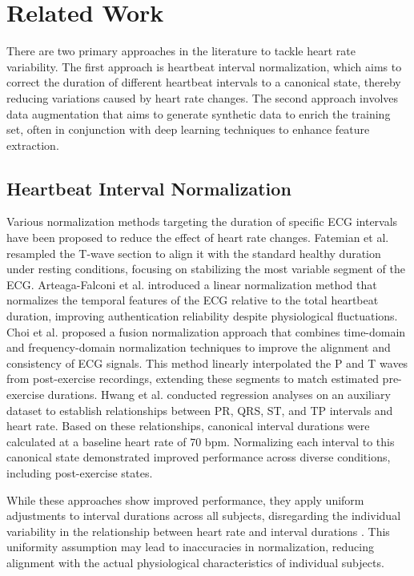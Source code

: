 \section{Related Work}

There are two primary approaches in the literature to tackle heart rate variability. The first approach is heartbeat interval normalization, which aims to correct the duration of different heartbeat intervals to a canonical state, thereby reducing variations caused by heart rate changes. The second approach involves data augmentation that aims to generate synthetic data to enrich the training set, often in conjunction with deep learning techniques to enhance feature extraction. 

\subsection{Heartbeat Interval Normalization}
Various normalization methods targeting the duration of specific ECG intervals have been proposed to reduce the effect of heart rate changes.
Fatemian et al. \cite{heartID} resampled the T-wave section to align it with the standard healthy duration under resting conditions, focusing on stabilizing the most variable segment of the ECG.
Arteaga-Falconi et al. \cite{Arteaga-Falconi2016} introduced a linear normalization method that normalizes the temporal features of the ECG relative to the total heartbeat duration, improving authentication reliability despite physiological fluctuations.
Choi et al. \cite{Choi2020} proposed a fusion normalization approach that combines time-domain and frequency-domain normalization techniques to improve the alignment and consistency of ECG signals. This method linearly interpolated the P and T waves from post-exercise recordings, extending these segments to match estimated pre-exercise durations.
Hwang et al. \cite{Hwang2021} conducted regression analyses on an auxiliary dataset to establish relationships between PR, QRS, ST, and TP intervals and heart rate.
Based on these relationships, canonical interval durations were calculated at a baseline heart rate of 70 bpm.
Normalizing each interval to this canonical state demonstrated improved performance across diverse conditions, including post-exercise states.

While these approaches show improved performance, they apply uniform adjustments to interval durations across all subjects, disregarding the individual variability in the relationship between heart rate and interval durations \cite{Malik2002}. This uniformity assumption may lead to inaccuracies in normalization, reducing alignment with the actual physiological characteristics of individual subjects.

